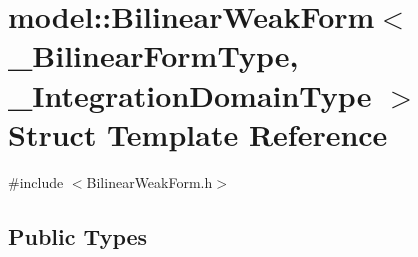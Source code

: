 \hypertarget{structmodel_1_1_bilinear_weak_form}{}\section{model\+:\+:Bilinear\+Weak\+Form$<$ \+\_\+\+Bilinear\+Form\+Type, \+\_\+\+Integration\+Domain\+Type $>$ Struct Template Reference}
\label{structmodel_1_1_bilinear_weak_form}


{\ttfamily \#include $<$Bilinear\+Weak\+Form.\+h$>$}

\subsection*{Public Types}
